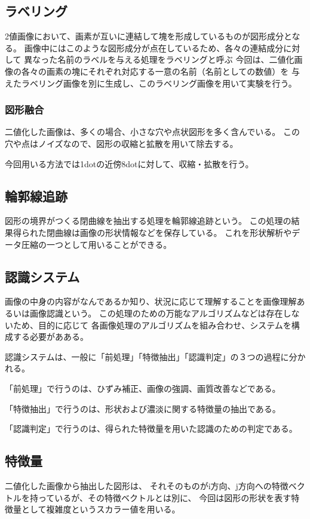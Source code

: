\documentclass{jarticle}[2012/05/15]
\begin{document}
\subsection{ラベリング}
2値画像において、画素が互いに連結して塊を形成しているものが図形成分となる。
画像中にはこのような図形成分が点在しているため、各々の連結成分に対して
異なった名前のラベルを与える処理をラベリングと呼ぶ
今回は、二値化画像の各々の画素の塊にそれぞれ対応する一意の名前（名前としての数値）を
与えたラベリング画像を別に生成し、このラベリング画像を用いて実験を行う。
\par
\subsubsection{図形融合}
二値化した画像は、多くの場合、小さな穴や点状図形を多く含んでいる。
この穴や点はノイズなので、図形の収縮と拡散を用いて除去する。
\par
今回用いる方法では1dotの近傍8dotに対して、収縮・拡散を行う。
\par
\subsection{輪郭線追跡}
図形の境界がつくる閉曲線を抽出する処理を輪郭線追跡という。
この処理の結果得られた閉曲線は画像の形状情報などを保存している。
これを形状解析やデータ圧縮の一つとして用いることができる。
\par
\subsection{認識システム}
画像の中身の内容がなんであるか知り、状況に応じて理解することを画像理解あるいは画像認識という。
この処理のための万能なアルゴリズムなどは存在しないため、目的に応じて
各画像処理のアルゴリズムを組み合わせ、システムを構成する必要があある。
\par
認識システムは、一般に「前処理」「特徴抽出」「認識判定」の３つの過程に分かれる。
\par
「前処理」で行うのは、ひずみ補正、画像の強調、画質改善などである。
\par
「特徴抽出」で行うのは、形状および濃淡に関する特徴量の抽出である。
\par
「認識判定」で行うのは、得られた特徴量を用いた認識のための判定である。
\par
\subsection{特徴量}
二値化した画像から抽出した図形は、
それそのものがi方向、j方向への特徴ベクトルを持っているが、その特徴ベクトルとは別に、
今回は図形の形状を表す特徴量として複雑度というスカラー値を用いる。
\par
\pagebreak
\end{document}
